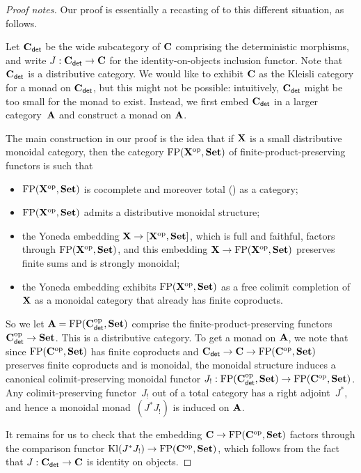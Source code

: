 \begin{proof}[Proof notes]
  Our proof is essentially a recasting of \cite[\S 7]{power-universal} to this different
  situation, as follows. 
  
  Let $\mathbf{C}_{\mathsf{det}}$ be the wide subcategory of $\mathbf{C}$ comprising the
  deterministic morphisms, and write $J:\mathbf{C}_{\mathsf{det}}\to\mathbf{C}$ for the
  identity-on-objects inclusion functor. Note that $\mathbf{C}_{\mathsf{det}}$ is a distributive category. We would
  like to exhibit $\mathbf{C}$ as the Kleisli category for a monad on
  $\mathbf{C}_{\mathsf{det}}$, but this might not be possible: intuitively, $\mathbf{C}_{\mathsf{det}}$
  might be too small for the monad to exist. Instead, we first embed
  $\mathbf{C}_{\mathsf{det}}$ in a larger category~$\mathbf{A}$ and construct a monad on $\mathbf{A}$.

  The main construction in our proof is the idea that if $\mathbf{X}$ is a
  small distributive monoidal category, then the category
  $\mathrm{FP}(\mathbf{X}^\mathrm{op},\mathbf{Set})$
  of finite-product-preserving functors is such that
  \begin{itemize}
  \item   $\mathrm{FP}(\mathbf{X}^\mathrm{op},\mathbf{Set})$ is cocomplete and moreover total (\cite{STREET1978350}) as a
    category;
  \item $\mathrm{FP}(\mathbf{X}^\mathrm{op},\mathbf{Set})$ admits a distributive monoidal structure;
  \item   the Yoneda embedding $\mathbf{X}\to[\mathbf{X}^\mathrm{op},\mathbf{Set}]$, which is
    full and faithful, factors through
    $\mathrm{FP}(\mathbf{X}^\mathrm{op},\mathbf{Set})$,
    and this embedding $\mathbf{X}\to \mathrm{FP}(\mathbf{X}^\mathrm{op},\mathbf{Set})$ preserves finite sums and is
    strongly monoidal;
  \item  the Yoneda embedding exhibits $\mathrm{FP}(\mathbf{X}^\mathrm{op},\mathbf{Set})$ as a free
    colimit completion of $\mathbf{X}$ as a monoidal category that already has
    finite coproducts.
  \end{itemize}

  So we let $\mathbf{A}=\mathrm{FP}(\mathbf{C}_{\mathsf{det}}^\mathrm{op},\mathbf{Set})$ comprise the
  finite-product-preserving functors $\mathbf{C}_{\mathsf{det}}^\mathrm{op}\to \mathbf{Set}$.
  This is a distributive category. 
  To get a monad on $\mathbf{A}$, we note that since
  $\mathrm{FP}(\mathbf{C}^\mathrm{op},\mathbf{Set})$ has finite coproducts and
  $\mathbf{C}_{\mathsf{det}}\to \mathbf{C}\to \mathrm{FP}(\mathbf{C}^\mathrm{op},\mathbf{Set})$  preserves finite
  coproducts and is monoidal, the
  monoidal structure
  induces a canonical colimit-preserving monoidal functor
  $J_!:\mathrm{FP}(\mathbf{C}_{\mathsf{det}}^\mathrm{op},\mathbf{Set})\to \mathrm{FP}(\mathbf{C}^\mathrm{op},\mathbf{Set})$.
  Any colimit-preserving functor~$J_!$ out of a total category 
  has a right adjoint~$J^*$, and hence a monoidal monad~$(J^*J_!)$ is induced on
  $\mathbf{A}$. 
  
  It remains for us to check that the embedding $\mathbf{C}\to
  \mathrm{FP}(\mathbf{C}^\mathrm{op},\mathbf{Set})$ factors through the comparison functor
  $\mathrm{Kl}(J^*J_!)\to \mathrm{FP}(\mathbf{C}^\mathrm{op},\mathbf{Set})$, which follows from the fact
  that $J:\mathbf{C}_{\mathsf{det}}\to\mathbf{C}$ is identity on objects.
\end{proof}
